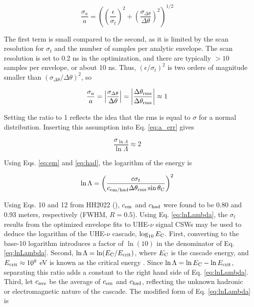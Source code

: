 \documentclass[amsmath,amssymb,aps,prd,10pt,twocolumn,showkeys]{revtex4}
\begin{document}
\begin{itemize}
\begin{equation}
\frac{\sigma_a}{a} = \left(\left(\frac{\epsilon}{\sigma_t}\right)^2 +  \left(\frac{\sigma_{\Delta\theta}}{\Delta\theta}\right)^2\right)^{1/2}
\end{equation}

The first term is small compared to the second, as it is limited by the scan resolution for $\sigma_t$ and the number of samples per analytic envelope.  The scan resolution is set to 0.2 ns in the optimization, and there are typically $>10$ samples per envelope, or about 10 ns.  Thus, $\left(\epsilon/\sigma_t\right)^2$ is two orders of magnitude smaller than $\left(\sigma_{\Delta\theta}/\Delta\theta\right)^2$, so

\begin{equation}
\frac{\sigma_a}{a} = \left|\frac{\sigma_{\Delta\theta}}{\Delta\theta}\right| = \left|\frac{\Delta\theta_{\rm rms}}{\Delta\theta_{\rm rms}}\right|\approx 1
\end{equation}

Setting the ratio to 1 reflects the idea that the rms is equal to $\sigma$ for a normal distribution.  Inserting this assumption into Eq. \ref{eq:a_err} gives

\begin{equation}
\frac{\sigma_{\ln\Lambda}}{\ln\Lambda} \approx 2 \label{eq:a_err_2}
\end{equation}

Using Eqs. \ref{eq:em} and \ref{eq:had}, the logarithm of the energy is

\begin{equation}
\ln\Lambda = \left( \frac{c\sigma_t}{c_{\rm em/had} \Delta\theta_{\rm rms}\sin\theta_{\rm C}} \right)^2 \label{eq:lnLambda}
\end{equation}

Using Eqs. 10 and 12 from HH2022 (\cite{PhysRevD.105.123019}), $c_{\rm em}$ and $c_{\rm had}$ were found to be 0.80 and 0.93 meters, respectively (FWHM, $R=0.5$).  Using Eq. \ref{eq:lnLambda}, the $\sigma_t$ results from the optimized envelope fits to UHE-$\nu$ signal CSWs may be used to deduce the logarithm of the UHE-$\nu$ cascade, $\log_{10} E_{\rm C}$.  First, converting to the base-10 logarithm introduces a factor of $\ln(10)$ in the denominator of Eq. \ref{eq:lnLambda}.  Second, $\ln\Lambda = \ln(E_{\rm C}/E_{\rm crit})$, where $E_{\rm C}$ is the cascade energy, and $E_{\rm crit}\approx 10^8$ eV is known as the critical energy \cite{PhysRevD.105.123019}.  Since $\ln\Lambda = \ln E_{\rm C} - \ln E_{\rm crit}$, separating this ratio adds a constant to the right hand side of Eq. \ref{eq:lnLambda}.  Third, let $c_{\rm ave}$ be the average of $c_{\rm em}$ and $c_{\rm had}$, reflecting the unknown hadronic or electromagnetic nature of the cascade.  The modified form of Eq. \ref{eq:lnLambda} is


\end{itemize}
\end{document}
